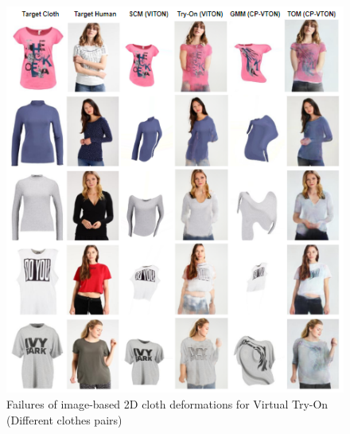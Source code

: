 \begin{figure}[t]
\centering
\includegraphics[scale=0.6]{figures/2dvton_diff.png}
\caption{Failures of image-based 2D cloth deformations for Virtual Try-On (Different clothes pairs)}
\label{fig:2dvtondiff}
\end{figure}


